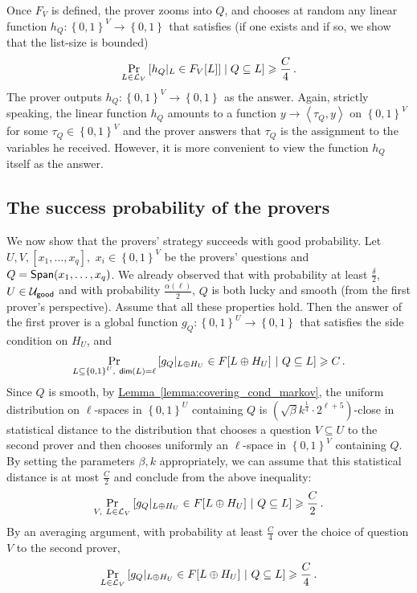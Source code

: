 \documentclass[11pt]{article}
\numberwithin{equation}{section}
\theoremstyle{definition}
\theoremstyle{plain}
\newcommand{\expref}[2]{\hyperref[#2]{#1~\ref{#2}}}
\newcommand\set[1]{{\left\{ #1 \right\}}}
\newcommand\Prob[2]{{\Pr_{#1}\left[ {#2} \right]}}
\newcommand\power[1]{\set{0,1}^{#1}}
\newcommand*\xor{\mathbin{\oplus}}
\begin{document}
Once $F_{V}$ is defined, the prover zooms into $Q$,
 and chooses at random any linear function
$h_Q\colon \power{V}\to\power{}$ that satisfies (if one exists and if so, we show that the list-size is bounded)
\begin{equation} \label{eqn:prover2-strat}
\Prob{L \in {\cal L}_V}{h_Q|_{L} \in F_V[L]] \mid Q \subseteq L}\geqslant \frac{C}{4}\,.%
\end{equation}
The prover outputs $h_Q: \power{V} \to \power{}$ as the answer. Again, strictly speaking,
 the linear function $h_Q$  amounts to a function
$y \to \left< \tau_Q, y\right> $ on $\power{V}$ for some $\tau_Q \in \power{V}$ and the prover answers that $\tau_Q$ is the
assignment to the  variables he received. However, it
is more convenient to view the function $h_Q$ itself as the answer.

\subsection{The success probability of the provers}
We now show that the provers' strategy succeeds with good probability.  Let
%
%
 $U, V, [x_1,\ldots, x_q],$ $x_i \in \power{V}$  %
be the provers' questions and $Q = {\sf Span}(x_1,\ldots, x_q)$.
We already observed that with probability
at least $\frac{\delta}{2}$,
 $U \in {\cal U}_{\sf good} $ and with probability $\frac{\alpha(\ell)}{2}$, $Q$ is both lucky and smooth (from the first
prover's perspective). Assume that all these properties hold. Then the answer of the first prover is a global function
$g_Q : \power{U} \to \power{}$ that satisfies the side condition on $H_U$, and
\[
  \Prob{L \subseteq \power{U}, ~{\sf dim}(L)=\ell}{g_Q|_{L\xor H_U}  \in F[L\xor H_U]  ~|  ~Q \subseteq L}\geqslant C\,.%
\]
Since $Q$ is smooth, by \expref{Lemma}{lemma:covering_cond_markov}, the uniform distribution on $\ell$-spaces in $\power{U}$ containing $Q$ is $(\sqrt{\beta} k^{\frac{1}{4}}\cdot 2^{\ell+5})$-close in statistical distance
to the distribution that chooses a question $V \subseteq U$ to the second prover and then chooses uniformly an $\ell$-space in $\power{V}$ containing $Q$. By setting the
parameters $\beta, k$ appropriately, we can assume that this statistical distance is at most $\frac{C}{2}$ and
conclude from the above inequality:
\[
  \Prob{V, ~L \in {\cal L}_V}{g_Q|_{L\xor H_U}  \in F[L\xor H_U]  ~|  ~Q \subseteq L}\geqslant \frac{C}{2}\,.%
\]
By an averaging argument, with probability at least $\frac{C}{4}$ over the choice of question $V$ to the second prover,
\[
  \Prob{L \in {\cal L}_V}{g_Q|_{L\xor H_U}  \in F[L\xor H_U]  ~|  ~Q \subseteq L}\geqslant \frac{C}{4}\,.%
\]
\end{document}
